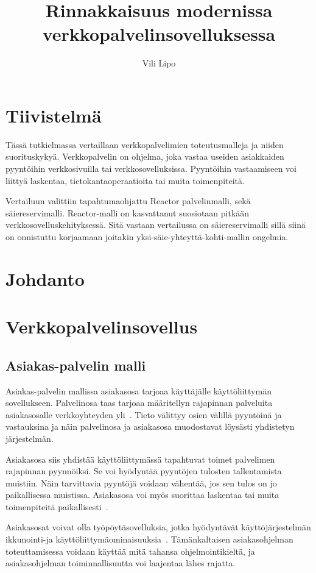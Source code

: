 \documentclass[12pt]{article}
\title{Rinnakkaisuus modernissa verkkopalvelinsovelluksessa}
\author{Vili Lipo}
\begin{document}
\maketitle
\newpage
\tableofcontents
\newpage
{}
\section*{Tiivistelmä}
Tässä tutkielmassa vertaillaan verkkopalvelimien toteutusmalleja
ja niiden suorituskykyä. Verkkopalvelin on ohjelma, joka vastaa useiden asiakkaiden pyyntöihin
verkkosivuilla tai verkkosovelluksissa. Pyyntöihin vastaamiseen
voi liittyä laskentaa, tietokantaoperaatioita tai muita toimenpiteitä.

Vertailuun valittiin tapahtumaohjattu Reactor palvelinmalli, sekä säiereservimalli.
Reactor-malli on kasvattanut suosiotaan pitkään verkkosovelluskehityksessä.
Sitä vastaan vertailussa on säiereservimalli sillä siinä on
onnistuttu korjaamaan joitakin yksi-säie-yhteyttä-kohti-mallin ongelmia.
\section{Johdanto}
\section{Verkkopalvelinsovellus}
\subsection{Asiakas-palvelin malli}
Asiakas-palvelin mallissa
asiakasosa tarjoaa käyttäjälle käyttöliittymän sovellukseen. Palvelinosa taas
tarjoaa määritellyn rajapinnan
palveluita asiakasosalle verkkoyhteyden yli~\cite{sinha_client-server_1992}.
Tieto välittyy osien välillä pyyntöinä ja vastauksina ja näin palvelinosa ja asiakasosa
muodostavat löysästi yhdistetyn järjestelmän.

Asiakasosa siis yhdistää käyttöliittymässä tapahtuvat toimet palvelimen
rajapinnan pyynnöiksi. Se voi hyödyntää pyyntöjen tulosten tallentamista
muistiin. Näin tarvittavia pyyntöjä voidaan vähentää, jos sen tulos
on jo paikallisessa muistissa. Asiakasosa voi myös suorittaa
laskentaa tai muita toimenpiteitä paikallisesti~\cite{sinha_client-server_1992}.

Asiakasosat voivat olla työpöytäsovelluksia, jotka hyödyntävät käyttöjärjestelmän
ikkunointi-ja käyttöliittymäominaisuuksia~\cite{sinha_client-server_1992}.
Tämänkaltaisen asiakasohjelman toteuttamisessa voidaan käyttää mitä tahansa ohjelmointikieltä,
ja asiakasohjelman toiminnallisuutta voi laajentaa lähes rajatta.
\end{document}
